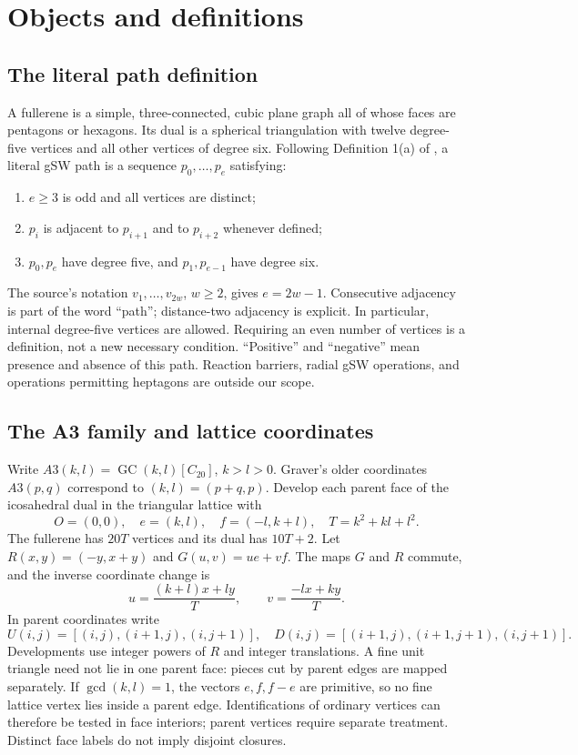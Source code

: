 \documentclass[11pt]{amsart}
\newcommand{\GC}{\operatorname{GC}}
\begin{document}
\section{Objects and definitions}\label{sec:definitions}
\subsection{The literal path definition}
A fullerene is a simple, three-connected, cubic plane graph all of whose
faces are pentagons or hexagons. Its dual is a spherical triangulation
with twelve degree-five vertices and all other vertices of degree six.
Following Definition 1(a) of \cite{BBS}, a literal gSW path is a sequence
$p_0,\ldots,p_e$ satisfying:
\begin{enumerate}
\item $e\ge3$ is odd and all vertices are distinct;
\item $p_i$ is adjacent to $p_{i+1}$ and to $p_{i+2}$ whenever defined;
\item $p_0,p_e$ have degree five, and $p_1,p_{e-1}$ have degree six.
\end{enumerate}
The source's notation $v_1,\ldots,v_{2w}$, $w\ge2$, gives $e=2w-1$.
Consecutive adjacency is part of the word ``path''; distance-two
adjacency is explicit. In particular, internal degree-five vertices
are allowed. Requiring an even number of vertices is a definition, not
a new necessary condition. ``Positive'' and ``negative'' mean presence
and absence of this path. Reaction barriers, radial gSW operations,
and operations permitting heptagons are outside our scope.

\subsection{The A3 family and lattice coordinates}
Write $A3(k,l)=\GC(k,l)[C_{20}]$, $k>l>0$. Graver's older coordinates
$A3(p,q)$ correspond to $(k,l)=(p+q,p)$. Develop each parent face of
the icosahedral dual in the triangular lattice with
\[
 O=(0,0),\quad e=(k,l),\quad f=(-l,k+l),\quad T=k^2+kl+l^2.
\]
The fullerene has $20T$ vertices and its dual has $10T+2$. Let
$R(x,y)=(-y,x+y)$ and $G(u,v)=ue+vf$. The maps $G$ and $R$ commute,
and the inverse coordinate change is
\begin{equation}\label{eq:1}
 u=\frac{(k+l)x+ly}{T},\qquad v=\frac{-lx+ky}{T}.\tag{1}
\end{equation}
In parent coordinates write
\[
 U(i,j)=[(i,j),(i+1,j),(i,j+1)],\quad
 D(i,j)=[(i+1,j),(i+1,j+1),(i,j+1)].
\]
Developments use integer powers of $R$ and integer translations. A fine
unit triangle need not lie in one parent face: pieces cut by parent
edges are mapped separately. If $\gcd(k,l)=1$, the vectors $e,f,f-e$
are primitive, so no fine lattice vertex lies inside a parent edge.
Identifications of ordinary vertices can therefore be tested in face
interiors; parent vertices require separate treatment. Distinct face
labels do not imply disjoint closures.
\end{document}
